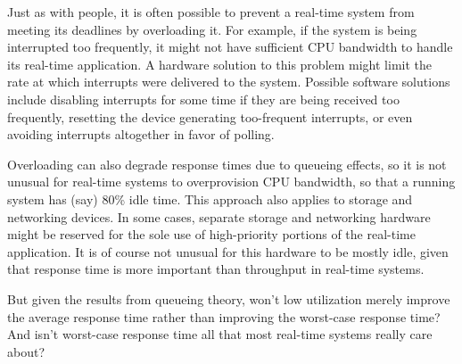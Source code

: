 Just as with people, it is often possible to prevent a real-time system
from meeting its deadlines by overloading it.
For example, if the system is being interrupted too frequently, it might
not have sufficient CPU bandwidth to handle its real-time application.
A hardware solution to this problem might limit the rate at which
interrupts were delivered to the system.
Possible software solutions include disabling interrupts for some time if
they are being received too frequently,
resetting the device generating too-frequent interrupts,
or even avoiding interrupts altogether in favor of polling.

Overloading can also degrade response times due to queueing effects,
so it is not unusual for real-time systems to overprovision CPU bandwidth,
so that a running system has (say) 80\% idle time.
This approach also applies to storage and networking devices.
In some cases, separate storage and networking hardware might be reserved
for the sole use of high-priority portions of the real-time application.
It is of course not unusual for this hardware to be mostly idle, given
that response time is more important than throughput in
real-time systems.

\QuickQuiz{}
	But given the results from queueing theory, won't low utilization
	merely improve the average response time rather than improving
	the worst-case response time?
	And isn't worst-case response time all that most
	real-time systems really care about?
 \QuickQuizEnd

